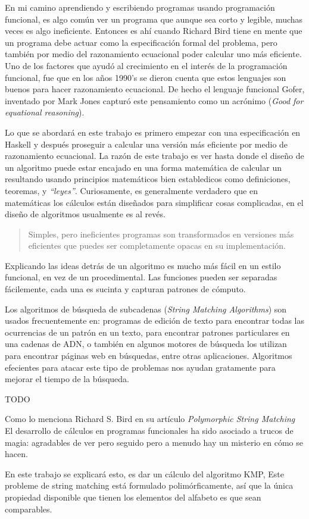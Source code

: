 En mi camino aprendiendo y escribiendo programas usando programación funcional, es algo común ver un programa
que aunque sea corto y legible, muchas veces es algo ineficiente. Entonces es ahí cuando Richard Bird tiene
en mente que un programa debe actuar como la especificación formal del problema, pero también por medio del
razonamiento ecuacional poder calcular uno más eficiente.
Uno de los factores que ayudó al crecimiento en el interés de la programación funcional, fue que en los años
1990's se dieron cuenta que estos lenguajes son buenos para hacer razonamiento ecuacional.
De hecho el lenguaje funcional Gofer, inventado por Mark Jones capturó este pensamiento como un acrónimo 
(\textit{Good for equational reasoning}).
\newline

Lo que se abordará en este trabajo es primero empezar con una especificación en Haskell y después proseguir a
calcular una versión más eficiente por medio de razonamiento ecuacional.
La razón de este trabajo es ver hasta donde el diseño de un algoritmo puede estar encajado en una forma
matemática de calcular un resultando usando principios matemáticos bien establedicos como definiciones, 
teoremas, y \textit{``leyes''}.
Curiosamente, es generalmente verdadero que en matemáticas los cálculos están diseñados para simplificar
cosas complicadas, en el diseño de algoritmos usualmente es al revés.
\begin{quote}
Simples, pero ineficientes programas son transformados en versiones más eficientes que puedes ser
completamente opacas en su implementación.
\end{quote}
Explicando las ideas detrás de un algoritmo es mucho más fácil en un estilo funcional, en vez de un
procedimental. Las funciones pueden ser separadas fácilemente, cada una es sucinta y capturan patrones
de cómputo.
\newline

Los algoritmos de búsqueda de subcadenas (\textit{String Matching Algorithms}) son usados frecuentemente en:
programas de edición de texto para encontrar todas las ocurrencias de un patrón en un texto, para encontrar
patrones particulares en una cadenas de ADN, o también en algunos motores de búsqueda los utilizan para
encontrar páginas web en búsquedas, entre otras aplicaciones. Algoritmos efecientes para atacar este tipo de
problemas nos ayudan gratamente para mejorar el tiempo de la búsqueda.
\newline

TODO

Como lo menciona Richard S. Bird en su artículo \emph{Polymorphic String Matching}\cite{book:1505279}
El desarrollo de cálculos en programas funcionales ha sido asociado a trucos de magia: agradables de ver pero seguido pero a menudo hay un misterio en cómo se hacen.

En este trabajo se explicará esto, es dar un cálculo del algoritmo KMP,
Este probleme de string matching está formulado polimórficamente, así que la única propiedad disponible que tienen los elementos del alfabeto es que sean comparables.